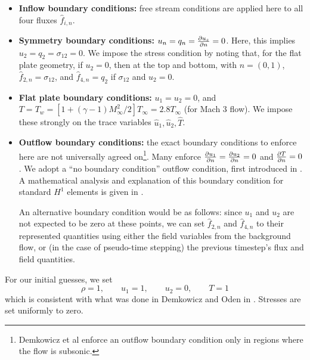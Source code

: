 \begin{itemize}
\item \textbf{Inflow boundary conditions:} free stream conditions are applied here to all four fluxes $\widehat{f}_{i,n}$.
\item \textbf{Symmetry boundary conditions:} $u_n = q_n = \pd{u_s}{n} = 0$. Here, this implies $u_2 = q_2 = \sigma_{12} = 0$. We impose the stress condition by noting that, for the flat plate geometry, if $u_2 = 0$, then at the top and bottom, with $n = (0,1)$, $\widehat{f}_{2,n} = \sigma_{12}$, and $\widehat{f}_{4,n} = q_2$ if $\sigma_{12}$ and $u_2 = 0$. 
\item \textbf{Flat plate boundary conditions:} $u_1 = u_2 = 0$, and $T = T_w = \left[1+(\gamma-1)M_\infty^2/2\right] T_\infty = 2.8T_\infty$ (for Mach 3 flow). We impose these strongly on the trace variables $\widehat{u}_1, \widehat{u}_2, \widehat{T}$. 
\item \textbf{Outflow boundary conditions:} the exact boundary conditions to enforce here are not universally agreed on\footnote{Demkowicz et al enforce an outflow boundary condition only in regions where the flow is subsonic.\cite{Demkowicz:1990:NFE:112271.112276}}. Many enforce $\pd{u_1}{n}=\pd{u_2}{n}=0$ and $\pd{T}{n} = 0$. We adopt a ``no boundary condition'' outflow condition, first introduced in \cite{FLD:FLD1650140506}. A mathematical analysis and explanation of this boundary condition for standard $H^1$ elements is given in \cite{FLD:FLD505}. 

An alternative boundary condition would be as follows: since $u_1$ and $u_2$ are not expected to be zero at these points, we can set $\widehat{f}_{2,n}$ and $\widehat{f}_{4,n}$ to their represented quantities using either the field variables from the background flow, or (in the case of pseudo-time stepping) the previous timestep's flux and field quantities. 

\end{itemize}

For our initial guesses, we set
\[
\rho = 1,\qquad u_1= 1,\qquad u_2 = 0, \qquad T = 1
\]
which is consistent with what was done in Demkowicz and Oden in \cite{Demkowicz:1990:NFE:112271.112276}. Stresses are set uniformly to zero.

